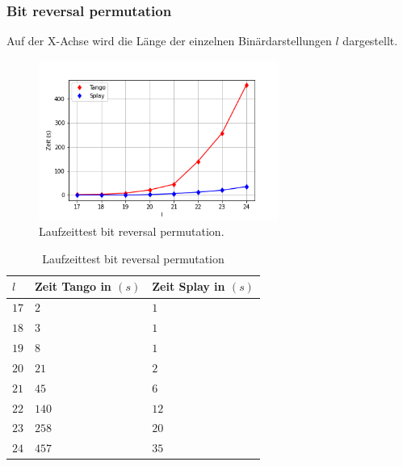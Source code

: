 \documentclass[a4paper,12pt]{article}
\begin{document}
\subsubsection{Bit reversal permutation}
Auf der X-Achse wird die Länge der einzelnen Binärdarstellungen $l$ dargestellt.
\begin{figure}[H]
	\centering
	\includegraphics[width=0.7\textwidth]{"Medien/laufzeittest/diagramm/brp"}
	\caption{Laufzeittest bit reversal permutation.}
	\label{fig:ResultGUI}
\end{figure}
 \begin{table}[H]
	\begin{center}
		\begin{tabular}[c]{|l|l|l|}
			\hline
			$l$ & Zeit Tango in $\left(s\right)$ &Zeit Splay in $\left(s\right)$ \\
			\hline
			$17$ & $2$ &$1$ \\
			\hline
			$18$  & $3$ &$1$  \\
			\hline
			$19$  & $8$ &$1$  \\
			\hline
			$20$  & $21$ &$2$  \\
			\hline
			$21$  & $45$ &$6$  \\
			\hline
			$22$  & $140$ &$12$  \\
			\hline
			$23$  & $258$ &$20$  \\
			\hline
			$24$  & $457$ &$35$  \\
			\hline
		\end{tabular}
		\caption{Laufzeittest bit reversal permutation} 
	\end{center}
\end{table}
\end{document}
